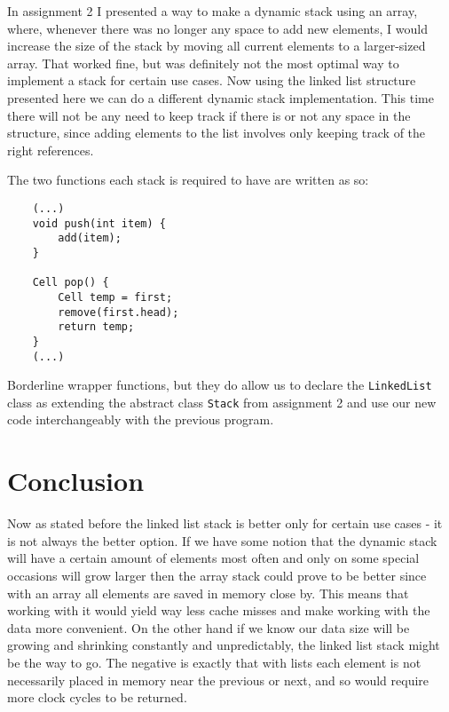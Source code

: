 \documentclass[a4paper,11pt]{article}
\begin{document}
In assignment 2 I presented a way to make a dynamic stack using an array, where, whenever there was no longer any space to add new elements, I would increase the size of the stack by moving all current elements to a larger-sized array. That worked fine, but was definitely not the most optimal way to implement a stack for certain use cases. Now using the linked list structure presented here we can do a different dynamic stack implementation. This time there will not be any need to keep track if there is or not any space in the structure, since adding elements to the list involves only keeping track of the right references. 

The two functions each stack is required to have are written as so:

\begin{verbatim}
    (...)
    void push(int item) {
        add(item);
    }

    Cell pop() {
        Cell temp = first;
        remove(first.head);
        return temp;
    }
    (...)
\end{verbatim}

Borderline wrapper functions, but they do allow us to declare the {\tt LinkedList} class as extending the abstract class {\tt Stack} from assignment 2 and use our new code interchangeably with the previous program.
\\

\section*{Conclusion}
\label{sec:conc}
Now as stated before the linked list stack is better only for certain use cases - it is not always the better option. If we have some notion that the dynamic stack will have a certain amount of elements most often and only on some special occasions will grow larger then the array stack could prove to be better since with an array all elements are saved in memory close by. This means that working with it would yield way less cache misses and make working with the data more convenient. On the other hand if we know our data size will be growing and shrinking constantly and unpredictably, the linked list stack might be the way to go. The negative is exactly that with lists each element is not necessarily placed in memory near the previous or next, and so would require more clock cycles to be returned.
\end{document}
